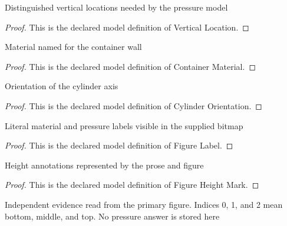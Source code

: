 \begin{definition}
  \label{def:physics:phyx-mini-0663:phyxminiproblems-problemphyxmini0663-verticallocation}
  Distinguished vertical locations needed by the pressure model
\end{definition}
\begin{proof}
  This is the declared model definition of Vertical Location.
\end{proof}
\begin{definition}
  \label{def:physics:phyx-mini-0663:phyxminiproblems-problemphyxmini0663-containermaterial}
  Material named for the container wall
\end{definition}
\begin{proof}
  This is the declared model definition of Container Material.
\end{proof}
\begin{definition}
  \label{def:physics:phyx-mini-0663:phyxminiproblems-problemphyxmini0663-cylinderorientation}
  Orientation of the cylinder axis
\end{definition}
\begin{proof}
  This is the declared model definition of Cylinder Orientation.
\end{proof}
\begin{definition}
  \label{def:physics:phyx-mini-0663:phyxminiproblems-problemphyxmini0663-figurelabel}
  Literal material and pressure labels visible in the supplied bitmap
\end{definition}
\begin{proof}
  This is the declared model definition of Figure Label.
\end{proof}
\begin{definition}
  \label{def:physics:phyx-mini-0663:phyxminiproblems-problemphyxmini0663-figureheightmark}
  Height annotations represented by the prose and figure
\end{definition}
\begin{proof}
  This is the declared model definition of Figure Height Mark.
\end{proof}
\begin{definition}
  \label{def:physics:phyx-mini-0663:phyxminiproblems-problemphyxmini0663-layeredcylinderfigure}
  Independent evidence read from the primary figure. Indices 0, 1, and 2 mean bottom, middle, and top. No pressure answer is stored here
\end{definition}

